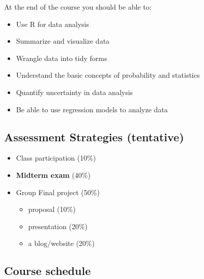 \documentclass[
  letterpaper,
  DIV=11,
  numbers=noendperiod]{scrartcl}
\providecommand{\tightlist}{%
  \setlength{\itemsep}{0pt}\setlength{\parskip}{0pt}}
\begin{document}
At the end of the course you should be able to:

\begin{itemize}
\tightlist
\item
  Use R for data analysis
\item
  Summarize and visualize data
\item
  Wrangle data into tidy forms
\item
  Understand the basic concepts of probability and statistics
\item
  Quantify uncertainty in data analysis
\item
  Be able to use regression models to analyze data
\end{itemize}

\subsection{Assessment Strategies
(tentative)}\label{assessment-strategies-tentative}

\begin{itemize}
\tightlist
\item
  Class participation (10\%)
\item
  \textbf{Midterm exam} (40\%)
\item
  Group Final project (50\%)

  \begin{itemize}
  \tightlist
  \item
    proposal (10\%)
  \item
    presentation (20\%)
  \item
    a blog/website (20\%)
  \end{itemize}
\end{itemize}

\subsection{Course schedule}\label{course-schedule}
\end{document}
